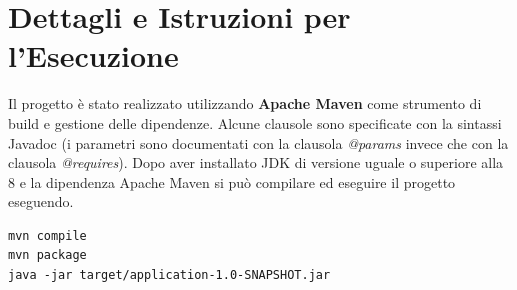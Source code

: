 \documentclass[12pt]{report}
\begin{document}
\tableofcontents

\chapter{Dettagli e Istruzioni per l'Esecuzione}

Il progetto è stato realizzato utilizzando \textbf{Apache Maven} come strumento di build e gestione delle dipendenze.
Alcune clausole sono specificate con la sintassi Javadoc
(i parametri sono documentati con la clausola \textit{@params} invece che con la clausola \textit{@requires}).
Dopo aver installato JDK di versione uguale o superiore alla 8 e la dipendenza Apache Maven
si può compilare ed eseguire il progetto eseguendo.
\begin{lstlisting}
mvn compile
mvn package
java -jar target/application-1.0-SNAPSHOT.jar
\end{lstlisting}


\appendix

%
%
\end{document}
